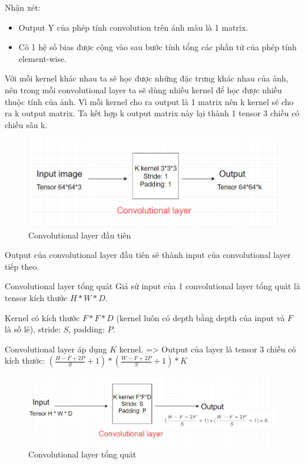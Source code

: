 Nhận xét:
\begin{itemize}
\item Output Y của phép tính convolution trên ảnh màu là 1 matrix.
\item Có 1 hệ số bias được cộng vào sau bước tính tổng các phần tử của phép tính element-wise.
\end{itemize}

Với mỗi kernel khác nhau ta sẽ học được những đặc trưng khác nhau của ảnh, nên trong mỗi convolutional layer ta sẽ dùng nhiều kernel để học được nhiều thuộc tính của ảnh. Vì mỗi kernel cho ra output là 1 matrix nên k kernel sẽ cho ra k output matrix. Ta kết hợp k output matrix này lại thành 1 tensor 3 chiều có chiều sâu k.

\FloatBarrier
\begin{figure}[htp]
\begin{center}
\includegraphics[scale=0.8]{chap2/c2_figs/15.png}
\end{center}
\caption{Convolutional layer đầu tiên}
\label{fig:conv-firstlayer}
\end{figure}
\FloatBarrier

Output của convolutional layer đầu tiên sẽ thành input của convolutional layer tiếp theo.

Convolutional layer tổng quát
Giả sử input của 1 convolutional layer tổng quát là tensor kích thước $H * W * D$.

Kernel có kích thước $F * F * D$ (kernel luôn có depth bằng depth của input và $F$ là số lẻ), stride: $S$, padding: $P$.

Convolutional layer áp dụng $K$ kernel.
=> Output của layer là tensor 3 chiều có kích thước: $ (\frac{H-F+2P}{S} + 1) * (\frac{W-F+2P}{S} + 1) * K$

\FloatBarrier
\begin{figure}[htp]
\begin{center}
\includegraphics[scale=0.8]{chap2/c2_figs/16.png}
\end{center}
\caption{Convolutional layer tổng quát}
\label{fig:conv-tongquat}
\end{figure}
\FloatBarrier

